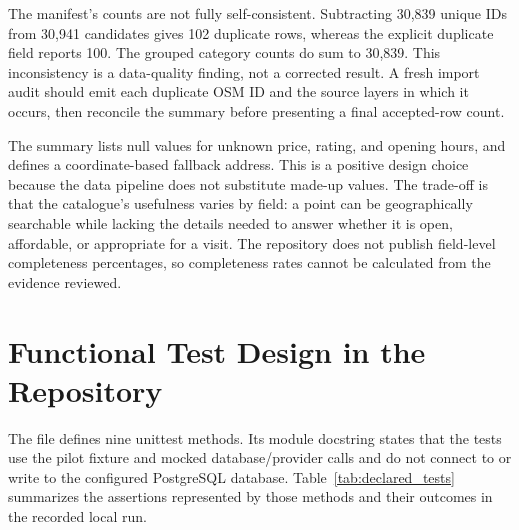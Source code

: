 The manifest's counts are not fully self-consistent. Subtracting 30,839 unique IDs from 30,941 candidates gives 102 duplicate rows, whereas the explicit duplicate field reports 100. The grouped category counts do sum to 30,839. This inconsistency is a data-quality finding, not a corrected result. A fresh import audit should emit each duplicate OSM ID and the source layers in which it occurs, then reconcile the summary before presenting a final accepted-row count.

The summary lists null values for unknown price, rating, and opening hours, and defines a coordinate-based fallback address. This is a positive design choice because the data pipeline does not substitute made-up values. The trade-off is that the catalogue's usefulness varies by field: a point can be geographically searchable while lacking the details needed to answer whether it is open, affordable, or appropriate for a visit. The repository does not publish field-level completeness percentages, so completeness rates cannot be calculated from the evidence reviewed.

\section{Functional Test Design in the Repository}

The file  defines nine unittest methods. Its module docstring states that the tests use the pilot fixture and mocked database/provider calls and do not connect to or write to the configured PostgreSQL database. Table~\ref{tab:declared_tests} summarizes the assertions represented by those methods and their outcomes in the recorded local run.

